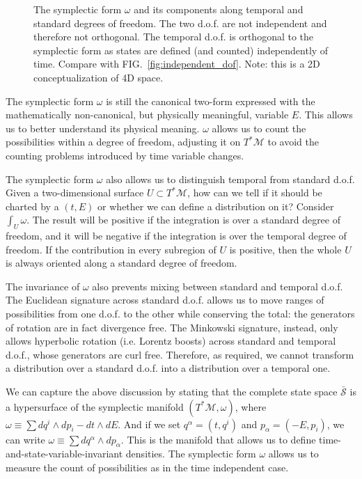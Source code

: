 \documentclass[smallextended]{svjour3}
\numberwithin{equation}{section}
\theoremstyle{definition}
\begin{document}
\begin{figure}
	
	\caption{The symplectic form $\omega$ and its components along temporal and standard degrees of freedom. The two d.o.f. are not independent and therefore not orthogonal. The temporal d.o.f. is orthogonal to the symplectic form as states are defined (and counted) independently of time. Compare with FIG.~\ref{fig:independent_dof}. Note: this is a 2D conceptualization of 4D space.}
	\label{fig:temporal_dof}
\end{figure}

The symplectic form $\omega$ is still the canonical two-form expressed with the mathematically non-canonical, but physically meaningful, variable $E$. This allows us to better understand its physical meaning. $\omega$ allows us to count the possibilities within a degree of freedom, adjusting it on $T^*\mathcal{M}$ to avoid the counting problems introduced by time variable changes.

The symplectic form $\omega$ also allows us to distinguish temporal from standard d.o.f. Given a two-dimensional surface $U \subset T^*\mathcal{M}$, how can we tell if it should be charted by a $(t,E)$ or whether we can define a distribution on it? Consider $\int_U \omega$. The result will be positive if the integration is over a standard degree of freedom, and it will be negative if the integration is over the temporal degree of freedom. If the contribution in every subregion of $U$ is positive, then the whole $U$ is always oriented along a standard degree of freedom.

The invariance of $\omega$ also prevents mixing between standard and temporal d.o.f. The Euclidean signature across standard d.o.f. allows us to move ranges of possibilities from one d.o.f. to the other while conserving the total: the generators of rotation are in fact divergence free. The Minkowski signature, instead, only allows hyperbolic rotation (i.e. Lorentz boosts) across standard and temporal d.o.f., whose generators are curl free. Therefore, as required, we cannot transform a distribution over a standard d.o.f. into a distribution over a temporal one.

We can capture the above discussion by stating that the complete state space $\bar{\mathcal{S}}$ is a hypersurface of the symplectic manifold $(T^*\mathcal{M}, \omega)$, where $\omega \equiv \sum dq^i \wedge dp_i - dt \wedge dE$. And if we set $q^\alpha = (t, q^i)$ and $p_\alpha = (-E, p_i)$, we can write $\omega \equiv \sum dq^\alpha \wedge dp_\alpha$. This is the manifold that allows us to define time-and-state-variable-invariant densities. The symplectic form $\omega$ allows us to measure the count of possibilities as in the time independent case.
\end{document}
